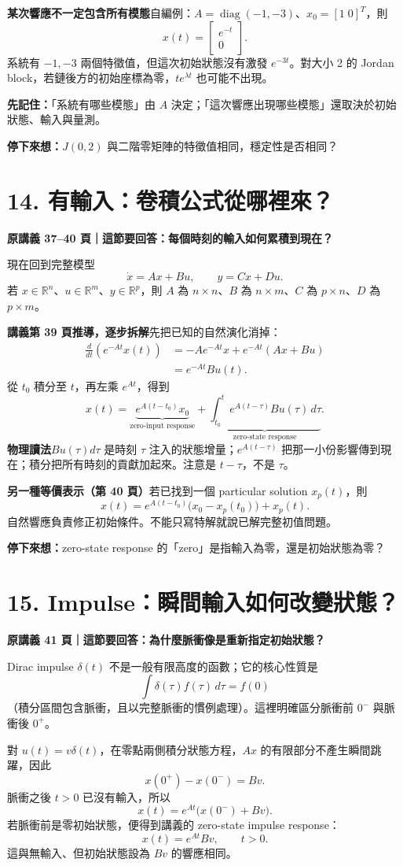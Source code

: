 \documentclass[12pt,a4paper]{article}
\newcommand{\topic}[3]{\clearpage\section*{#1}\textcolor{accent}{\textbf{原講義 #2 頁｜這節要回答：#3}}\par}
\newcommand{\key}[1]{\par\textcolor{accent}{\textbf{先記住：}}#1\par}
\newcommand{\checkq}[1]{\par\textbf{停下來想：}#1\par}
\newcommand{\R}{\mathbb R}
\DeclareMathOperator{\diag}{diag}
\begin{document}
\textbf{某次響應不一定包含所有模態}\quad 自編例：$A=\diag(-1,-3)$、$x_0=[1\;0]^T$，則
\[
 x(t)=\begin{bmatrix}e^{-t}\\0\end{bmatrix}.
\]
系統有 $-1,-3$ 兩個特徵值，但這次初始狀態沒有激發 $e^{-3t}$。對大小 2 的 Jordan block，若鏈後方的初始座標為零，$te^{\lambda t}$ 也可能不出現。

\key{「系統有哪些模態」由 $A$ 決定；「這次響應出現哪些模態」還取決於初始狀態、輸入與量測。}
\checkq{$J(0,2)$ 與二階零矩陣的特徵值相同，穩定性是否相同？}

\topic{14. 有輸入：卷積公式從哪裡來？}{37--40}{每個時刻的輸入如何累積到現在？}
現在回到完整模型
\[
 \dot x=Ax+Bu,\qquad y=Cx+Du.
\]
若 $x\in\R^n$、$u\in\R^m$、$y\in\R^p$，則 $A$ 為 $n\times n$、$B$ 為 $n\times m$、$C$ 為 $p\times n$、$D$ 為 $p\times m$。

\textbf{講義第 39 頁推導，逐步拆解}\quad 先把已知的自然演化消掉：
\begin{align*}
 \frac{d}{dt}(e^{-At}x(t))
 &=-Ae^{-At}x+e^{-At}(Ax+Bu)\\
 &=e^{-At}Bu(t).
\end{align*}
從 $t_0$ 積分至 $t$，再左乘 $e^{At}$，得到
\[
\boxed{x(t)=\underbrace{e^{A(t-t_0)}x_0}_{\text{zero-input response}}
 +\underbrace{\int_{t_0}^{t}e^{A(t-\tau)}Bu(\tau)\,d\tau}_{\text{zero-state response}}.}
\]
\textbf{物理讀法}\quad $Bu(\tau)d\tau$ 是時刻 $\tau$ 注入的狀態增量；$e^{A(t-\tau)}$ 把那一小份影響傳到現在；積分把所有時刻的貢獻加起來。注意是 $t-\tau$，不是 $\tau$。

\textbf{另一種等價表示（第 40 頁）}\quad 若已找到一個 particular solution $x_p(t)$，則
\[
 x(t)=e^{A(t-t_0)}\bigl(x_0-x_p(t_0)\bigr)+x_p(t).
\]
自然響應負責修正初始條件。不能只寫特解就說已解完整初值問題。
\checkq{zero-state response 的「zero」是指輸入為零，還是初始狀態為零？}

\topic{15. Impulse：瞬間輸入如何改變狀態？}{41}{為什麼脈衝像是重新指定初始狀態？}
Dirac impulse $\delta(t)$ 不是一般有限高度的函數；它的核心性質是
\[
 \int \delta(\tau)f(\tau)\,d\tau=f(0)
\]
（積分區間包含脈衝，且以完整脈衝的慣例處理）。這裡明確區分脈衝前 $0^-$ 與脈衝後 $0^+$。

對 $u(t)=v\delta(t)$，在零點兩側積分狀態方程，$Ax$ 的有限部分不產生瞬間跳躍，因此
\[
\boxed{x(0^+)-x(0^-)=Bv.}
\]
脈衝之後 $t>0$ 已沒有輸入，所以
\[
 x(t)=e^{At}\bigl(x(0^-)+Bv\bigr).
\]
若脈衝前是零初始狀態，便得到講義的 zero-state impulse response：
\[
\boxed{x(t)=e^{At}Bv,\qquad t>0.}
\]
這與無輸入、但初始狀態設為 $Bv$ 的響應相同。
\end{document}
